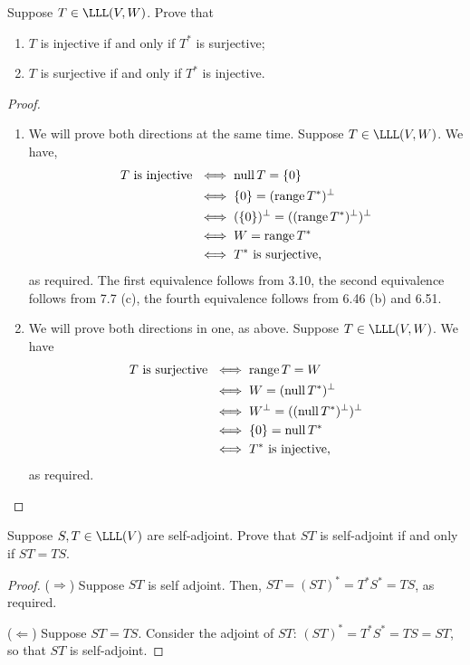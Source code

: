 \begin{exercise}{4}
  Suppose $T\in\LLL(V,W)$. Prove that
  \begin{enumerate}
      \item $T$ is injective if and only if $T^\ast$ is surjective;
      \item $T$ is surjective if and only if $T^\ast$ is injective.
  \end{enumerate}
\end{exercise}
\begin{proof}
\begin{enumerate}
    \item We will prove both directions at the same time. Suppose $T\in\LLL(V,W)$. We have,
    \begin{align*}
        T\text{ is injective }&\iff\operatorname*{null} T=\{0\}\\
        &\iff\{0\}=(\operatorname*{range} T^\ast)^\perp\\
        &\iff(\{0\})^\perp=((\operatorname*{range} T^\ast)^\perp)^\perp\\
        &\iff W=\operatorname*{range} T^\ast\\
        &\iff T^\ast\text{ is surjective,}
    \end{align*}
    as required. The first equivalence follows from 3.10, the second equivalence follows from 7.7 (c), the fourth equivalence follows from 6.46 (b) and 6.51.
    \item We will prove both directions in one, as above. Suppose $T\in\LLL(V,W)$. We have
    \begin{align*}
        T\text{ is surjective }&\iff\operatorname*{range} T=W\\
        &\iff W=(\operatorname*{null} T^\ast)^\perp\\
        &\iff W^\perp=((\operatorname*{null} T^\ast)^\perp)^\perp\\
        &\iff \{0\}=\operatorname*{null} T^\ast\\
        &\iff T^\ast\text{ is injective,}
    \end{align*}
    as required.
\end{enumerate}
\end{proof}

\begin{exercise}{7}
  Suppose $S,T\in\LLL(V)$ are self-adjoint. Prove that $ST$ is self-adjoint if and only if $ST=TS$.
\end{exercise}
\begin{proof}
 ($\Rightarrow$) Suppose $ST$ is self adjoint. Then, $ST = (ST)^\ast = T^\ast S^\ast = TS$, as required.

 ($\Leftarrow$) Suppose $ST=TS$. Consider the adjoint of $ST$: $(ST)^\ast = T^\ast S^\ast = TS = ST$, so that $ST$ is self-adjoint.
\end{proof}

